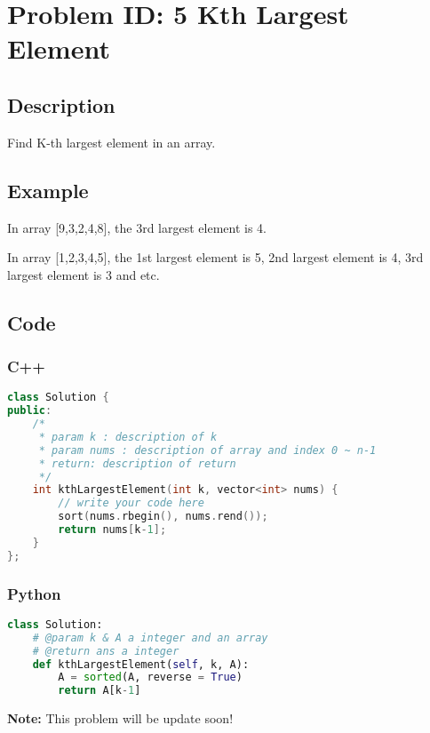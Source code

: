 \section{Problem ID: 5 Kth Largest Element}
\subsection{Description}
Find K-th largest element in an array.

\subsection{Example}
In array [9,3,2,4,8], the 3rd largest element is 4.

In array [1,2,3,4,5], the 1st largest element is 5, 2nd largest element is 4, 3rd largest element is 3 and etc.

\subsection{Code}
\scriptsize
\subsubsection{C++}
\begin{lstlisting}[language=C++]
class Solution {
public:
    /*
     * param k : description of k
     * param nums : description of array and index 0 ~ n-1
     * return: description of return
     */
    int kthLargestElement(int k, vector<int> nums) {
        // write your code here
        sort(nums.rbegin(), nums.rend());
        return nums[k-1];
    }
};
\end{lstlisting}

\subsubsection{Python}
\begin{lstlisting}[language=Python]
class Solution:
    # @param k & A a integer and an array
    # @return ans a integer
    def kthLargestElement(self, k, A):
        A = sorted(A, reverse = True)
        return A[k-1]
\end{lstlisting}
\normalsize 
\textbf{Note: }This problem will be update soon!